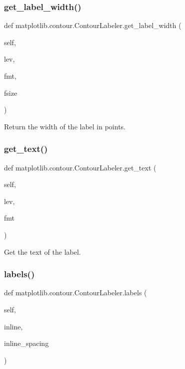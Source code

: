 \subsubsection{\texorpdfstring{get\+\_\+label\+\_\+width()}{get\_label\_width()}}
{\footnotesize\ttfamily def matplotlib.\+contour.\+Contour\+Labeler.\+get\+\_\+label\+\_\+width (\begin{DoxyParamCaption}\item[{}]{self,  }\item[{}]{lev,  }\item[{}]{fmt,  }\item[{}]{fsize }\end{DoxyParamCaption})}

\begin{DoxyVerb}Return the width of the label in points.
\end{DoxyVerb}
 \mbox{\label{classmatplotlib_1_1contour_1_1ContourLabeler_a891b8a9f8a7a03f4d8a3cea0f37f9a2c}} 
\subsubsection{\texorpdfstring{get\+\_\+text()}{get\_text()}}
{\footnotesize\ttfamily def matplotlib.\+contour.\+Contour\+Labeler.\+get\+\_\+text (\begin{DoxyParamCaption}\item[{}]{self,  }\item[{}]{lev,  }\item[{}]{fmt }\end{DoxyParamCaption})}

\begin{DoxyVerb}Get the text of the label.\end{DoxyVerb}
 \mbox{\label{classmatplotlib_1_1contour_1_1ContourLabeler_ac1a3f2aec4f02436937755a215efcfea}} 
\subsubsection{\texorpdfstring{labels()}{labels()}}
{\footnotesize\ttfamily def matplotlib.\+contour.\+Contour\+Labeler.\+labels (\begin{DoxyParamCaption}\item[{}]{self,  }\item[{}]{inline,  }\item[{}]{inline\+\_\+spacing }\end{DoxyParamCaption})}

